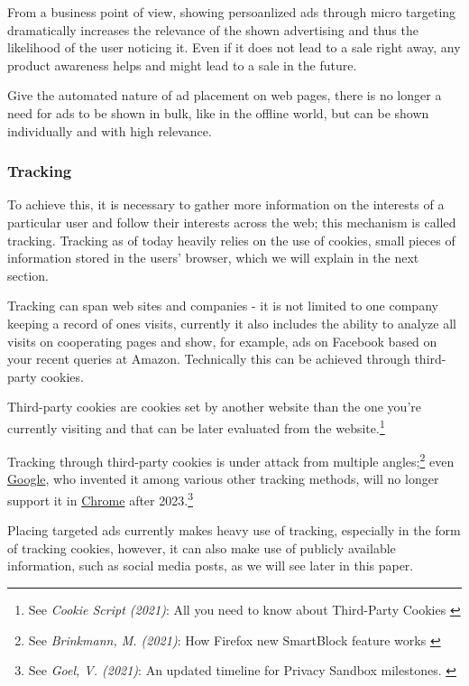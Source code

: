 From a business point of view, showing persoanlized ads through micro targeting dramatically increases the relevance of the shown advertising and thus the likelihood of the user noticing it. Even if it does not lead to a sale right away, any product awareness helps and might lead to a sale in the future. 

Give the automated nature of ad placement on web pages, there is no longer a need for ads to be shown in bulk, like in the offline world, but can be shown individually and with high relevance. 

\subsubsection{Tracking}

To achieve this, it is necessary to gather more information on the interests of a particular user and follow their interests across the web; this mechanism is called tracking. Tracking as of today heavily relies on the use of cookies, small pieces of information stored in the users' browser, which we will explain in the next section.

Tracking can span web sites and companies - it is not limited to one company keeping a record of ones visits, currently it also includes the ability to analyze all visits on cooperating pages and show, for example, ads on Facebook based on your recent queries at Amazon. Technically this can be achieved through third-party cookies.

Third-party cookies are cookies set by another website than the one you're currently visiting and that can be later evaluated from the website.\footnote{See \textit{Cookie Script (2021)}: All you need to know about Third-Party Cookies \cite{mozillaBlog}}

Tracking through third-party cookies is under attack from multiple angles;\footnote{See \textit{Brinkmann, M. (2021)}: How Firefox new SmartBlock feature works \cite{mozillaBlog}} even \href{https://www.google.com/}{Google}, who invented it among various other tracking methods, will no longer support it in \href{https://www.google.com/chrome/}{Chrome} after 2023.\footnote{See \textit{Goel, V. (2021)}: An updated timeline for Privacy Sandbox milestones. \cite{sandboxDelay}}

Placing targeted ads currently makes heavy use of tracking, especially in the form of tracking cookies, however, it can also make use of publicly available information, such as social media posts, as we will see later in this paper.

